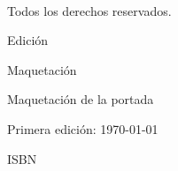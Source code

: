 
\thispagestyle{empty}

\vspace*{\fill}
\small
\textbf{\mytitle}\par
\medskip
\textcopyright~\the\year\ \mypublishingcompany \par
Todos los derechos reservados. \par
\medskip

\medskip
Edición\par
\quad\textbf{\editorName}\par
Maquetación\par
\quad\textbf{\typesetterName}\par
Maquetación de la portada\par
\quad\textbf{\designerName}\par

\medskip
Primera edición: \today\par
ISBN \softcoverISBN\par
\vspace*{\fill}

\clearpage
